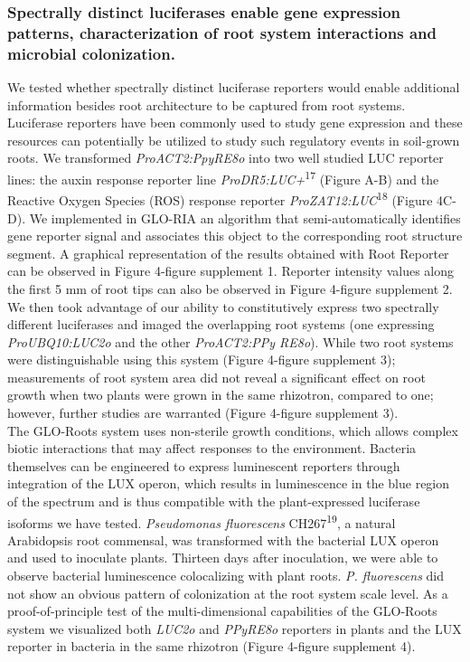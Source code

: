 \documentclass[]{article}
\begin{document}
\subsubsection{Spectrally distinct luciferases enable gene expression
patterns, characterization of root system interactions and microbial
colonization.}\label{spectrally-distinct-luciferases-enable-gene-expression-patterns-characterization-of-root-system-interactions-and-microbial-colonization.}

We tested whether spectrally distinct luciferase reporters would enable
additional information besides root architecture to be captured from
root systems. Luciferase reporters have been commonly used to study gene
expression and these resources can potentially be utilized to study such
regulatory events in soil-grown roots. We transformed
\emph{ProACT2:PpyRE8o} into two well studied LUC reporter lines: the
auxin response reporter line \emph{ProDR5:LUC+}\textsuperscript{17}
(Figure A-B) and the Reactive Oxygen Species (ROS) response reporter
\emph{ProZAT12:LUC}\textsuperscript{18} (Figure 4C-D). We implemented in
GLO-RIA an algorithm that semi-automatically identifies gene reporter
signal and associates this object to the corresponding root structure
segment. A graphical representation of the results obtained with Root
Reporter can be observed in Figure 4-figure supplement 1. Reporter
intensity values along the first 5 mm of root tips can also be observed
in Figure 4-figure supplement 2. We then took advantage of our ability
to constitutively express two spectrally different luciferases and
imaged the overlapping root systems (one expressing
\emph{ProUBQ10:LUC2o} and the other \emph{ProACT2:PPy RE8o}). While two
root systems were distinguishable using this system (Figure 4-figure
supplement 3); measurements of root system area did not reveal a
significant effect on root growth when two plants were grown in the same
rhizotron, compared to one; however, further studies are warranted
(Figure 4-figure supplement 3).\\The GLO-Roots system uses non-sterile
growth conditions, which allows complex biotic interactions that may
affect responses to the environment. Bacteria themselves can be
engineered to express luminescent reporters through integration of the
LUX operon, which results in luminescence in the blue region of the
spectrum and is thus compatible with the plant-expressed luciferase
isoforms we have tested. \emph{Pseudomonas fluorescens}
CH267\textsuperscript{19}, a natural Arabidopsis root commensal, was
transformed with the bacterial LUX operon and used to inoculate plants.
Thirteen days after inoculation, we were able to observe bacterial
luminescence colocalizing with plant roots. \emph{P. fluorescens} did
not show an obvious pattern of colonization at the root system scale
level. As a proof-of-principle test of the multi-dimensional
capabilities of the GLO-Roots system we visualized both \emph{LUC2o} and
\emph{PPyRE8o} reporters in plants and the LUX reporter in bacteria in
the same rhizotron (Figure 4-figure supplement 4).
\end{document}
